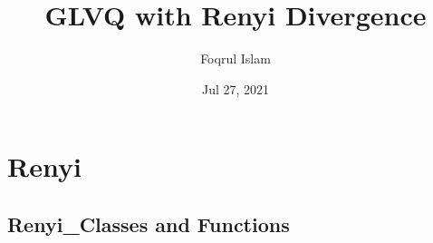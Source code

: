 \documentclass[letterpaper,10pt,english]{sphinxmanual}
\title{GLVQ with Renyi Divergence}
\date{Jul 27, 2021}
\author{Foqrul Islam}
\begin{document}
\pagestyle{empty}
\sphinxmaketitle
\pagestyle{plain}
\sphinxtableofcontents
\pagestyle{normal}
\label{\detokenize{index::doc}}



\chapter{Renyi}
\label{\detokenize{modules:renyi}}\label{\detokenize{modules::doc}}

\section{Renyi\_Classes and Functions}
\label{\detokenize{Renyi_final:renyi-classes-and-functions}}\label{\detokenize{Renyi_final::doc}}\label{\detokenize{Renyi_final:module-Renyi_final}}
\end{document}
